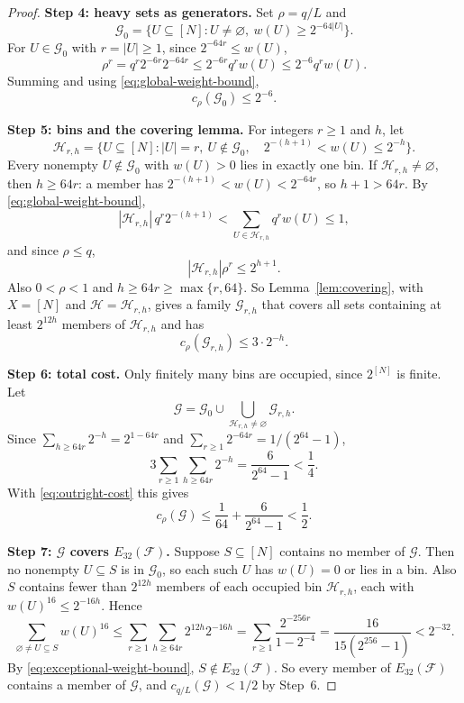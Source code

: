 \documentclass[11pt,letterpaper]{article}
\theoremstyle{definition}
\theoremstyle{remark}
\numberwithin{equation}{section}
\begin{document}
\begin{proof}
\medskip\noindent\textbf{Step 4: heavy sets as generators.} Set $\rho=q/L$ and
\[
 \mathcal G_0=
 \{U\subseteq[N]:U\ne\varnothing,\ w(U)\ge2^{-64|U|}\}.
\]
For $U\in\mathcal G_0$ with $r=|U|\ge1$, since $2^{-64r}\le w(U)$,
\[
 \rho^r=q^r2^{-6r}2^{-64r}
 \le2^{-6r}q^r w(U)
 \le2^{-6}q^r w(U).
\]
Summing and using \eqref{eq:global-weight-bound},
\begin{equation}\label{eq:outright-cost}
 c_\rho(\mathcal G_0)\le2^{-6}.
\end{equation}

\medskip\noindent\textbf{Step 5: bins and the covering lemma.} For integers $r\ge1$ and $h$, let
\[
 \mathcal H_{r,h}=
 \bigl\{U\subseteq[N]:|U|=r,\ U\notin\mathcal G_0,
 \quad 2^{-(h+1)}<w(U)\le2^{-h}\bigr\}.
\]
Every nonempty $U\notin\mathcal G_0$ with $w(U)>0$ lies in exactly one bin. If $\mathcal H_{r,h}\ne\varnothing$, then $h\ge64r$: a member has $2^{-(h+1)}<w(U)<2^{-64r}$, so $h+1>64r$. By \eqref{eq:global-weight-bound},
\[
 |\mathcal H_{r,h}|\,q^r2^{-(h+1)}
 <\sum_{U\in\mathcal H_{r,h}}q^r w(U)\le1,
\]
and since $\rho\le q$,
\[
 |\mathcal H_{r,h}|\rho^r\le2^{h+1}.
\]
Also $0<\rho<1$ and $h\ge64r\ge\max\{r,64\}$. So Lemma~\ref{lem:covering}, with $X=[N]$ and $\mathcal H=\mathcal H_{r,h}$, gives a family $\mathcal G_{r,h}$ that covers all sets containing at least $2^{12h}$ members of $\mathcal H_{r,h}$ and has
\[
 c_\rho(\mathcal G_{r,h})\le3\cdot2^{-h}.
\]

\medskip\noindent\textbf{Step 6: total cost.} Only finitely many bins are occupied, since $2^{[N]}$ is finite. Let
\[
 \mathcal G=\mathcal G_0\cup\bigcup_{\mathcal H_{r,h}\ne\varnothing}
 \mathcal G_{r,h}.
\]
Since $\sum_{h\ge64r}2^{-h}=2^{1-64r}$ and $\sum_{r\ge1}2^{-64r}=1/(2^{64}-1)$,
\begin{equation}\label{eq:bin-cost-sum}
 3\sum_{r\ge1}\sum_{h\ge64r}2^{-h}
 =\frac{6}{2^{64}-1}<\frac14.
\end{equation}
With \eqref{eq:outright-cost} this gives
\[
 c_\rho(\mathcal G)
 \le\frac1{64}+\frac{6}{2^{64}-1}<\frac12.
\]

\medskip\noindent\textbf{Step 7: $\mathcal G$ covers $E_{32}(\mathcal F)$.} Suppose $S\subseteq[N]$ contains no member of $\mathcal G$. Then no nonempty $U\subseteq S$ is in $\mathcal G_0$, so each such $U$ has $w(U)=0$ or lies in a bin. Also $S$ contains fewer than $2^{12h}$ members of each occupied bin $\mathcal H_{r,h}$, each with $w(U)^{16}\le2^{-16h}$. Hence
\begin{equation}\label{eq:bin-power-sum}
 \sum_{\varnothing\ne U\subseteq S}w(U)^{16}
 \le\sum_{r\ge1}\sum_{h\ge64r}2^{12h}2^{-16h}
 =\sum_{r\ge1}\frac{2^{-256r}}{1-2^{-4}}
 =\frac{16}{15(2^{256}-1)}<2^{-32}.
\end{equation}
By \eqref{eq:exceptional-weight-bound}, $S\notin E_{32}(\mathcal F)$. So every member of $E_{32}(\mathcal F)$ contains a member of $\mathcal G$, and $c_{q/L}(\mathcal G)<1/2$ by Step~6.
\end{proof}
\end{document}
